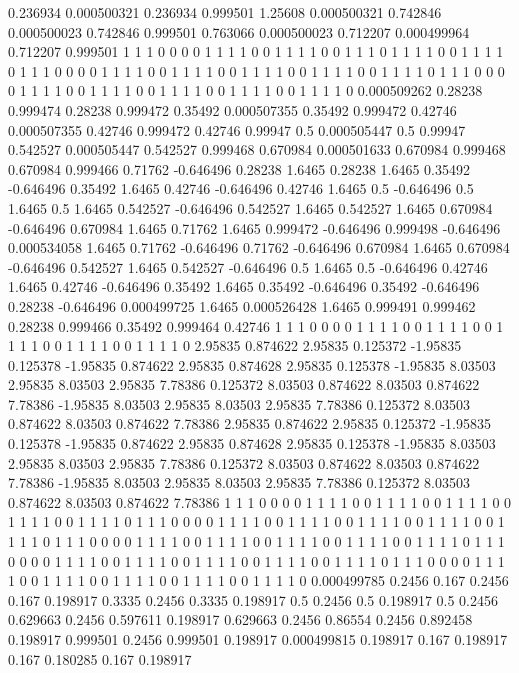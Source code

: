 0.236934 0.000500321
0.236934 0.999501
1.25608 0.000500321
0.742846 0.000500023
0.742846 0.999501
0.763066 0.000500023
0.712207 0.000499964
0.712207 0.999501
1 1
1 0
0 0
0 1
1 1
1 0
0 1
1 1
1 0
0 1
1 1
0 1
1 1
1 0
0 1
1 1
1 0
1 1
1 0
0 0
0 1
1 1
1 0
0 1
1 1
1 0
0 1
1 1
1 0
0 1
1 1
1 0
0 1
1 1
1 0
1 1
1 0
0 0
0 1
1 1
1 0
0 1
1 1
1 0
0 1
1 1
1 0
0 1
1 1
1 0
0 1
1 1
1 0
0.000509262 0.28238
0.999474 0.28238
0.999472 0.35492
0.000507355 0.35492
0.999472 0.42746
0.000507355 0.42746
0.999472 0.42746
0.99947 0.5
0.000505447 0.5
0.99947 0.542527
0.000505447 0.542527
0.999468 0.670984
0.000501633 0.670984
0.999468 0.670984
0.999466 0.71762
-0.646496 0.28238
1.6465 0.28238
1.6465 0.35492
-0.646496 0.35492
1.6465 0.42746
-0.646496 0.42746
1.6465 0.5
-0.646496 0.5
1.6465 0.5
1.6465 0.542527
-0.646496 0.542527
1.6465 0.542527
1.6465 0.670984
-0.646496 0.670984
1.6465 0.71762
1.6465 0.999472
-0.646496 0.999498
-0.646496 0.000534058
1.6465 0.71762
-0.646496 0.71762
-0.646496 0.670984
1.6465 0.670984
-0.646496 0.542527
1.6465 0.542527
-0.646496 0.5
1.6465 0.5
-0.646496 0.42746
1.6465 0.42746
-0.646496 0.35492
1.6465 0.35492
-0.646496 0.35492
-0.646496 0.28238
-0.646496 0.000499725
1.6465 0.000526428
1.6465 0.999491
0.999462 0.28238
0.999466 0.35492
0.999464 0.42746
1 1
1 0
0 0
0 1
1 1
1 0
0 1
1 1
1 0
0 1
1 1
1 0
0 1
1 1
1 0
0 1
1 1
1 0
2.95835 0.874622
2.95835 0.125372
-1.95835 0.125378
-1.95835 0.874622
2.95835 0.874628
2.95835 0.125378
-1.95835 8.03503
2.95835 8.03503
2.95835 7.78386
0.125372 8.03503
0.874622 8.03503
0.874622 7.78386
-1.95835 8.03503
2.95835 8.03503
2.95835 7.78386
0.125372 8.03503
0.874622 8.03503
0.874622 7.78386
2.95835 0.874622
2.95835 0.125372
-1.95835 0.125378
-1.95835 0.874622
2.95835 0.874628
2.95835 0.125378
-1.95835 8.03503
2.95835 8.03503
2.95835 7.78386
0.125372 8.03503
0.874622 8.03503
0.874622 7.78386
-1.95835 8.03503
2.95835 8.03503
2.95835 7.78386
0.125372 8.03503
0.874622 8.03503
0.874622 7.78386
1 1
1 0
0 0
0 1
1 1
1 0
0 1
1 1
1 0
0 1
1 1
1 0
0 1
1 1
1 0
0 1
1 1
1 0
1 1
1 0
0 0
0 1
1 1
1 0
0 1
1 1
1 0
0 1
1 1
1 0
0 1
1 1
1 0
0 1
1 1
1 0
1 1
1 0
0 0
0 1
1 1
1 0
0 1
1 1
1 0
0 1
1 1
1 0
0 1
1 1
1 0
0 1
1 1
1 0
1 1
1 0
0 0
0 1
1 1
1 0
0 1
1 1
1 0
0 1
1 1
1 0
0 1
1 1
1 0
0 1
1 1
1 0
1 1
1 0
0 0
0 1
1 1
1 0
0 1
1 1
1 0
0 1
1 1
1 0
0 1
1 1
1 0
0 1
1 1
1 0
0.000499785 0.2456
0.167 0.2456
0.167 0.198917
0.3335 0.2456
0.3335 0.198917
0.5 0.2456
0.5 0.198917
0.5 0.2456
0.629663 0.2456
0.597611 0.198917
0.629663 0.2456
0.86554 0.2456
0.892458 0.198917
0.999501 0.2456
0.999501 0.198917
0.000499815 0.198917
0.167 0.198917
0.167 0.180285
0.167 0.198917

